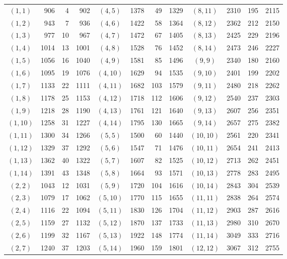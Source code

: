 \documentclass[11pt,a4paper]{article}
\theoremstyle{remark}
\begin{document}
\begin{center}
\begin{tabular}{crrr@{\quad}crrr@{\quad}crrr}
$(1,1)$ & 906 & 4 & 902 & $(4,5)$ & 1378 & 49 & 1329 & $(8,11)$ & 2310 & 195 & 2115 \\
$(1,2)$ & 943 & 7 & 936 & $(4,6)$ & 1422 & 58 & 1364 & $(8,12)$ & 2362 & 212 & 2150 \\
$(1,3)$ & 977 & 10 & 967 & $(4,7)$ & 1472 & 67 & 1405 & $(8,13)$ & 2425 & 229 & 2196 \\
$(1,4)$ & 1014 & 13 & 1001 & $(4,8)$ & 1528 & 76 & 1452 & $(8,14)$ & 2473 & 246 & 2227 \\
$(1,5)$ & 1056 & 16 & 1040 & $(4,9)$ & 1581 & 85 & 1496 & $(9,9)$ & 2340 & 180 & 2160 \\
$(1,6)$ & 1095 & 19 & 1076 & $(4,10)$ & 1629 & 94 & 1535 & $(9,10)$ & 2401 & 199 & 2202 \\
$(1,7)$ & 1133 & 22 & 1111 & $(4,11)$ & 1682 & 103 & 1579 & $(9,11)$ & 2480 & 218 & 2262 \\
$(1,8)$ & 1178 & 25 & 1153 & $(4,12)$ & 1718 & 112 & 1606 & $(9,12)$ & 2540 & 237 & 2303 \\
$(1,9)$ & 1218 & 28 & 1190 & $(4,13)$ & 1761 & 121 & 1640 & $(9,13)$ & 2607 & 256 & 2351 \\
$(1,10)$ & 1258 & 31 & 1227 & $(4,14)$ & 1795 & 130 & 1665 & $(9,14)$ & 2657 & 275 & 2382 \\
$(1,11)$ & 1300 & 34 & 1266 & $(5,5)$ & 1500 & 60 & 1440 & $(10,10)$ & 2561 & 220 & 2341 \\
$(1,12)$ & 1329 & 37 & 1292 & $(5,6)$ & 1547 & 71 & 1476 & $(10,11)$ & 2654 & 241 & 2413 \\
$(1,13)$ & 1362 & 40 & 1322 & $(5,7)$ & 1607 & 82 & 1525 & $(10,12)$ & 2713 & 262 & 2451 \\
$(1,14)$ & 1391 & 43 & 1348 & $(5,8)$ & 1664 & 93 & 1571 & $(10,13)$ & 2778 & 283 & 2495 \\
$(2,2)$ & 1043 & 12 & 1031 & $(5,9)$ & 1720 & 104 & 1616 & $(10,14)$ & 2843 & 304 & 2539 \\
$(2,3)$ & 1079 & 17 & 1062 & $(5,10)$ & 1770 & 115 & 1655 & $(11,11)$ & 2838 & 264 & 2574 \\
$(2,4)$ & 1116 & 22 & 1094 & $(5,11)$ & 1830 & 126 & 1704 & $(11,12)$ & 2903 & 287 & 2616 \\
$(2,5)$ & 1159 & 27 & 1132 & $(5,12)$ & 1870 & 137 & 1733 & $(11,13)$ & 2980 & 310 & 2670 \\
$(2,6)$ & 1199 & 32 & 1167 & $(5,13)$ & 1922 & 148 & 1774 & $(11,14)$ & 3049 & 333 & 2716 \\
$(2,7)$ & 1240 & 37 & 1203 & $(5,14)$ & 1960 & 159 & 1801 & $(12,12)$ & 3067 & 312 & 2755 \\

\end{tabular}
\end{center}
\end{document}
